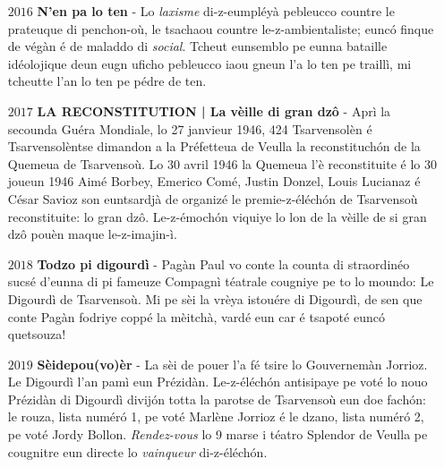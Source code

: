 \begin{center}
\begin{itemize}
\item[$2016$] \textbf{N'en pa lo ten} - Lo \textit{laxisme} di-z-eumpléyà pebleucco countre le prateuque di penchon-où, le tsachaou countre le-z-ambientaliste; eunc\'o finque de végàn é de maladdo di \textit{social}. Tcheut eunsemblo pe eunna bataille idéolojique deun eugn uficho pebleucco iaou gneun l'a lo ten pe traillì, mi tcheutte l'an lo ten pe pédre de ten.\newline

\item[$2017$] \textbf{LA RECONSTITUTION | La vèille di gran dz\^{o}} - Aprì la secounda Guéra Mondiale, lo 27 janvieur 1946, 424 Tsarvensolèn é Tsarvensolèntse dimandon a la Préfetteua de Veulla la reconstituch\'on de la Quemeua de Tsarvensoù. Lo 30 avril 1946 la Quemeua l'è reconstituite é lo 30 joueun 1946 Aimé Borbey, Emerico Comé, Justin Donzel, Louis Lucianaz é César Savioz son euntsardjà de organizé le premie-z-éléch\'on de Tsarvensoù reconstituite: lo gran dzô. Le-z-émoch\'on viquiye lo lon de la vèille de si gran dzô pouèn maque le-z-imajin-ì.

\item[$2018$] \textbf{Todzo pi digourdì} - Pagàn Paul vo conte la counta di straordinéo sucsé d'eunna di pi fameuze Compagnì téatrale cougniye pe to lo moundo: Le Digourdì de Tsarvensoù. Mi pe sèi la vrèya istouére di Digourdì, de sen que conte Pagàn fodriye coppé la mèitchà, vardé eun car é tsapoté eunc\'o quetsouza!\newline

\item[$2019$] \textbf{Sèidepou(vo)èr} - La sèi de pouer l'a fé tsire lo Gouvernemàn Jorrioz. Le Digourdì l'an pamì eun Prézidàn. Le-z-éléch\'on antisipaye pe voté lo nouo Prézidàn di Digourdì divij\'on totta la parotse de Tsarvensoù eun doe fach\'on: le rouza, lista numér\'o 1, pe voté Marlène Jorrioz é
le dzano, lista numér\'o 2, pe voté Jordy Bollon. \textit{Rendez-vous} lo 9 marse i téatro Splendor de Veulla pe cougnitre eun directe lo \textit{vainqueur} di-z-éléch\'on.

\end{itemize}
\end{center}
